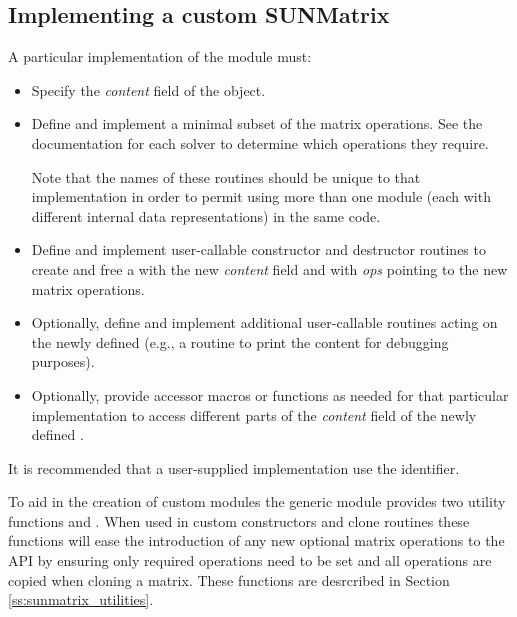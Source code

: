 \subsection{Implementing a custom SUNMatrix}\label{ss:sunmatrix_custom}

A particular implementation of the {\sunmatrix} module must:
\begin{itemize}
\item Specify the {\em content} field of the  object.
\item Define and implement a minimal subset of the matrix operations.
  See the documentation for each {\sundials} solver to determine which
  {\sunmatrix} operations they require.

  Note that the names of these routines should be unique to that
  implementation in order to permit using more than one {\sunmatrix}
  module (each with different  internal data
  representations) in the same code.
\item Define and implement user-callable constructor and destructor
  routines to create and free a  with
  the new {\em content} field and with {\em ops} pointing to the
  new matrix operations.
\item Optionally, define and implement additional user-callable routines
  acting on the newly defined  (e.g., a routine to print
  the content for debugging purposes).
\item Optionally, provide accessor macros or functions as needed for
  that particular implementation to access different parts
  of the {\em content} field of the newly defined .
\end{itemize}

It is recommended that a user-supplied {\sunmatrix} implementation use the
 identifier.

To aid in the creation of custom {\sunmatrix} modules the generic {\sunmatrix}
module provides two utility functions  and
. When used in custom {\sunmatrix} constructors and clone
routines these functions will ease the introduction of any new optional matrix
operations to the {\sunmatrix} API by ensuring only required operations need to
be set and all operations are copied when cloning a matrix. These functions
are desrcribed in Section \ref{ss:sunmatrix_utilities}.

